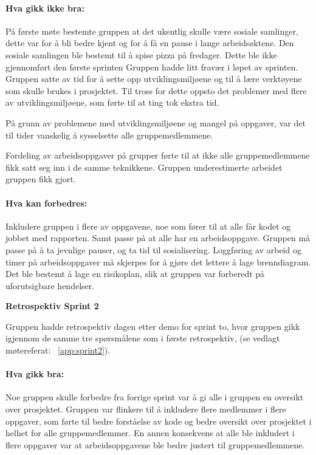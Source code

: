\documentclass[12pt,a4paper,norsk]{article}
\begin{document}
\paragraph{Hva gikk ikke bra:}
På første møte bestemte gruppen at det ukentlig skulle være sosiale samlinger, dette var for å bli bedre kjent og for å få en pause i lange arbeidsøktene. Den sosiale samlingen ble bestemt til å spise pizza på fredager. Dette ble ikke gjennomført den første sprinten
Gruppen hadde litt fravær i løpet av sprinten.
Gruppen satte av tid for å sette opp utviklingsmiljøene og til å lære verktøyene som skulle brukes i prosjektet. Til tross for dette oppsto det problemer med flere av utviklingsmiljøene, som førte til at ting tok ekstra tid.

På grunn av problemene med utviklingsmiljøene og mangel på oppgaver, var det til tider vanskelig å sysselsette alle gruppemedlemmene.

Fordeling av arbeidsoppgaver på grupper førte til at ikke alle gruppemedlemmene fikk satt seg inn i de samme teknikkene.
Gruppen underestimerte arbeidet gruppen fikk gjort.


\paragraph{Hva kan forbedres:}
Inkludere gruppen i flere av oppgavene, noe som fører til at alle får kodet og jobbet med rapporten. Samt passe på at alle har en arbeidsoppgave.
Gruppen må passe på å ta jevnlige pauser, og ta tid til sosialisering.
Loggføring av arbeid og timer på arbeidsoppgaver må skjerpes for å gjøre det lettere å lage brenndiagram.
Det ble bestemt å lage en risikoplan, slik at gruppen var forberedt på uforutsigbare hendelser.


\bigskip \noindent \textbf{Retrospektiv Sprint 2}
\par Gruppen hadde retrospektiv dagen etter demo for sprint to, hvor gruppen gikk igjennom de samme tre spørsmålene som i første retrospektiv, (se vedlagt møtereferat: ~\cref{app:sprint2}).

\paragraph{Hva gikk bra:}
Noe gruppen skulle forbedre fra forrige sprint var å gi alle i gruppen en oversikt over prosjektet. Gruppen var flinkere til å inkludere flere medlemmer i flere oppgaver, som førte til bedre forståelse av kode og bedre oversikt over prosjektet i helhet for alle gruppemedlemmer. En annen konsekvens at alle ble inkludert i flere oppgaver var at arbeidsoppgavene ble bedre justert til gruppemedlemmene.
\end{document}

